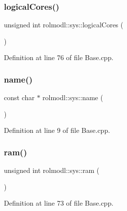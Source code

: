 \mbox{\label{namespacerolmodl_1_1sys_ad5852b03388e82203ee1637aec25d6ad}} 
\subsubsection{\texorpdfstring{logicalCores()}{logicalCores()}}
{\footnotesize\ttfamily unsigned int rolmodl\+::sys\+::logical\+Cores (\begin{DoxyParamCaption}{ }\end{DoxyParamCaption})\hspace{0.3cm}{\ttfamily [noexcept]}}



Definition at line 76 of file Base.\+cpp.

\mbox{\label{namespacerolmodl_1_1sys_a45b4fd534a68706be049e76057b5d944}} 
\subsubsection{\texorpdfstring{name()}{name()}}
{\footnotesize\ttfamily const char $\ast$ rolmodl\+::sys\+::name (\begin{DoxyParamCaption}{ }\end{DoxyParamCaption})\hspace{0.3cm}{\ttfamily [noexcept]}}



Definition at line 9 of file Base.\+cpp.

\mbox{\label{namespacerolmodl_1_1sys_a70ff276777bab09843e24810c773e7cf}} 
\subsubsection{\texorpdfstring{ram()}{ram()}}
{\footnotesize\ttfamily unsigned int rolmodl\+::sys\+::ram (\begin{DoxyParamCaption}{ }\end{DoxyParamCaption})\hspace{0.3cm}{\ttfamily [noexcept]}}



Definition at line 73 of file Base.\+cpp.

